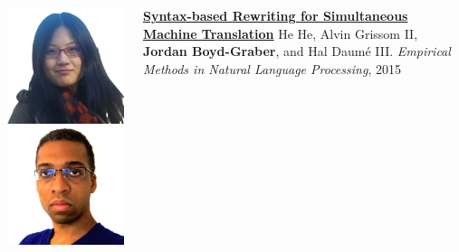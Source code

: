 \documentclass[aspectratio=169,xcolor=dvipsnames]{beamer}
\begin{document}
\begin{frame}{}

  \begin{columns}
        \includegraphics[width=0.8\linewidth]{general_figures/hehe} \\
        \includegraphics[width=0.8\linewidth]{general_figures/alvin}

        \begin{block}{ {\bf \href{http://umiacs.umd.edu/~jbg//docs/2015_emnlp_rewrite.pdf}{Syntax-based Rewriting for Simultaneous Machine Translation}}}
He He, Alvin Grissom II, {\bf Jordan Boyd-Graber}, and Hal {Daum\'{e} III}.  \emph{Empirical Methods in Natural Language Processing}, 2015
        \end{block}


\end{columns}
\end{frame}
\end{document}
